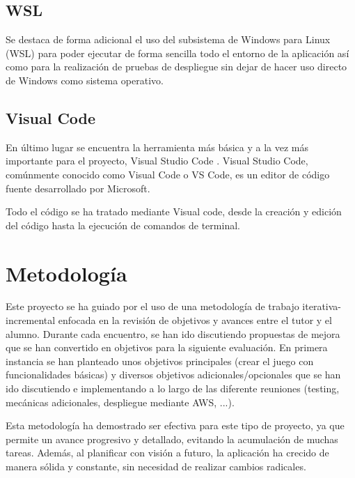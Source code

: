 \subsection{WSL}

Se destaca de forma adicional el uso del subsistema de Windows para Linux (WSL) \cite{wsl} para poder ejecutar de forma sencilla
todo el entorno de la aplicación así como para la realización de pruebas de despliegue sin dejar de hacer uso directo de Windows
como sistema operativo.

\subsection{Visual Code}

En último lugar se encuentra la herramienta más básica y a la vez más importante para
el proyecto, Visual Studio Code \cite{vscode}. Visual Studio Code, comúnmente conocido como Visual Code o VS Code,
es un editor de código fuente desarrollado por Microsoft.

Todo el código se ha tratado mediante Visual code, desde la creación y edición del código hasta la ejecución de comandos
de terminal.


\section{Metodología}

Este proyecto se ha guiado por el uso de una metodología de trabajo iterativa-incremental enfocada en la revisión de objetivos y
avances entre el tutor y el alumno. Durante cada encuentro, se han ido discutiendo propuestas de mejora que se han convertido en
objetivos para la siguiente evaluación. En primera instancia se han planteado unos objetivos principales (crear el juego
con funcionalidades básicas) y diversos objetivos adicionales/opcionales que se han ido discutiendo e
implementando a lo largo de las diferente reuniones (testing, mecánicas adicionales, despliegue mediante AWS, ...).

Esta metodología ha demostrado ser efectiva para este tipo de proyecto, ya que permite un avance progresivo y detallado,
evitando la acumulación de muchas tareas. Además, al planificar con visión a futuro, la aplicación ha crecido de manera sólida
y constante, sin necesidad de realizar cambios radicales.
